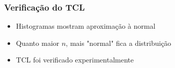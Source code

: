 \documentclass[12pt,a4paper]{article}
\begin{document}
\subsubsection{Verificação do TCL}
\begin{itemize}
    \item Histogramas mostram aproximação à normal
    \item Quanto maior $n$, mais "normal" fica a distribuição
    \item TCL foi verificado experimentalmente
\end{itemize}

\end{document}

